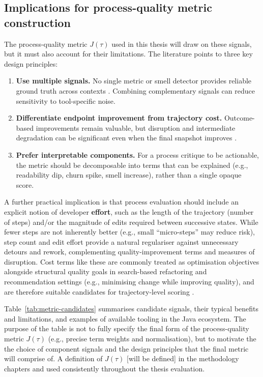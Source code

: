\subsection{Implications for process-quality metric construction}
The process-quality metric $J(\tau)$ used in this thesis will draw on these signals, but it must also account for their limitations. The literature points to three key design principles:
\begin{enumerate}
  \item \textbf{Use multiple signals.} No single metric or smell detector provides reliable ground truth across contexts \cite{paiva2017evaluation,arcellifontana2016falsepositives}. Combining complementary signals can reduce sensitivity to tool-specific noise.
  \item \textbf{Differentiate endpoint improvement from trajectory cost.} Outcome-based improvements remain valuable, but disruption and intermediate degradation can be significant even when the final snapshot improves \cite{paixao2017balancing}.
  \item \textbf{Prefer interpretable components.} For a process critique to be actionable, the metric should be decomposable into terms that can be explained (e.g., readability dip, churn spike, smell increase), rather than a single opaque score.
\end{enumerate}

A further practical implication is that process evaluation should include an explicit notion of developer \textbf{effort}, such as the length of the trajectory (number of steps) and/or the magnitude of edits required between successive states. While fewer steps are not inherently better (e.g., small ``micro-steps'' may reduce risk), step count and edit effort provide a natural regulariser against unnecessary detours and rework, complementing quality-improvement terms and measures of disruption. Cost terms like these are commonly treated as optimisation objectives alongside structural quality goals in search-based refactoring and recommendation settings (e.g., minimising change while improving quality), and are therefore suitable candidates for trajectory-level scoring \cite{harman2007pareto,mohan2019manyobjective}.

Table~\ref{tab:metric-candidates} summarises candidate signals, their typical benefits and limitations, and examples of available tooling in the Java ecosystem. The purpose of the table is not to fully specify the final form of the process-quality metric $J(\tau)$ (e.g., precise term weights and normalisation), but to motivate the the choice of component signals and the design principles that the final metric will comprise of. A definition of $J(\tau)$ [will be defined] in the methodology chapters and used consistently throughout the thesis evaluation.

